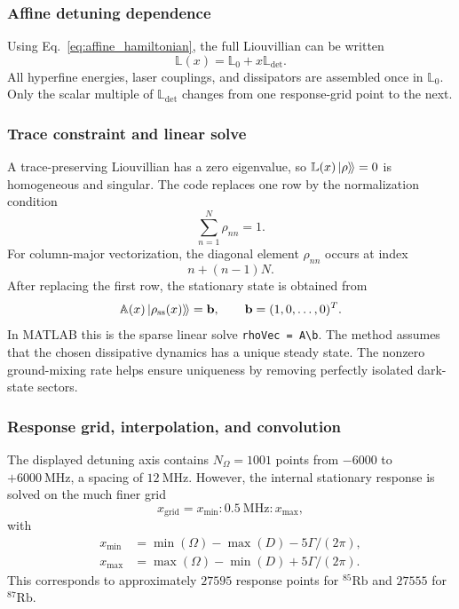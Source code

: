 \subsubsection{Affine detuning dependence}

Using Eq.~\eqref{eq:affine_hamiltonian}, the full Liouvillian can be written
\begin{equation}
\mathbb{L}(x)=\mathbb{L}_0+x\mathbb{L}_{\mathrm{det}}.
\label{eq:affine_liouvillian}
\end{equation}
All hyperfine energies, laser couplings, and dissipators are assembled once
in \(\mathbb{L}_0\).  Only the scalar multiple of
\(\mathbb{L}_{\mathrm{det}}\) changes from one response-grid point to the
next.

\subsubsection{Trace constraint and linear solve}

A trace-preserving Liouvillian has a zero eigenvalue, so
\(\mathbb{L}(x)\left|\rho\right\rangle\!\rangle=0\) is homogeneous and singular.  The code
replaces one row by the normalization condition
\begin{equation}
\sum_{n=1}^{N}\rho_{nn}=1.
\label{eq:trace_row}
\end{equation}
For column-major vectorization, the diagonal element \(\rho_{nn}\) occurs at
index
\begin{equation}
n+(n-1)N.
\end{equation}
After replacing the first row, the stationary state is obtained from
\begin{equation}
\mathbb{A}(x)\left|\rho_{\mathrm{ss}}(x)\right\rangle\!\rangle
=
\mathbf{b},
\qquad
\mathbf{b}=(1,0,\ldots,0)^T.
\label{eq:steady_state_linear_system}
\end{equation}
In MATLAB this is the sparse linear solve \texttt{rhoVec = A\textbackslash b}.
The method assumes that the chosen dissipative dynamics has a unique
steady state.  The nonzero ground-mixing rate helps ensure uniqueness by
removing perfectly isolated dark-state sectors.

\subsubsection{Response grid, interpolation, and convolution}

The displayed detuning axis contains \(N_\Omega=1001\) points from
\(-6000\) to \(+6000~\mathrm{MHz}\), a spacing of \(12~\mathrm{MHz}\).
However, the internal stationary response is solved on the much finer grid
\begin{equation}
x_{\mathrm{grid}}
=
x_{\min}:0.5~\mathrm{MHz}:x_{\max},
\end{equation}
with
\begin{equation}
\begin{split}
x_{\min}
&=
\min(\Omega)-\max(D)-5\Gamma/(2\pi),
\\
x_{\max}
&=
\max(\Omega)-\min(D)+5\Gamma/(2\pi).
\end{split}
\label{eq:response_grid_limits}
\end{equation}
This corresponds to approximately \(27595\) response points for
\(^{85}\mathrm{Rb}\) and \(27555\) for \(^{87}\mathrm{Rb}\).

